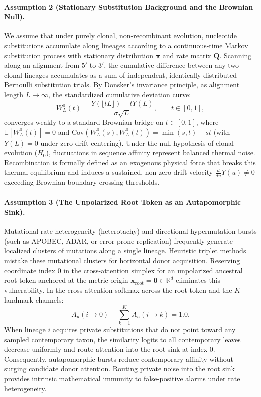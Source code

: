 \paragraph{Assumption 2 (Stationary Substitution Background and the Brownian Null).}
We assume that under purely clonal, non-recombinant evolution, nucleotide substitutions accumulate along lineages according to a continuous-time Markov substitution process with stationary distribution $\bm{\pi}$ and rate matrix $\mathbf{Q}$.
Scanning along an alignment from $5'$ to $3'$, the cumulative difference between any two clonal lineages accumulates as a sum of independent, identically distributed Bernoulli substitution trials.
By Donsker's invariance principle, as alignment length $L \to \infty$, the standardized cumulative deviation curve:
\begin{equation}
W_L^0(t) = \frac{Y(\lfloor tL \rfloor) - t Y(L)}{\sigma \sqrt{L}}, \qquad t \in [0, 1],
\end{equation}
converges weakly to a standard Brownian bridge on $t \in [0, 1]$, where $\mathbb{E}[W_L^0(t)] = 0$ and $\mathrm{Cov}(W_L^0(s), W_L^0(t)) = \min(s, t) - st$ (with $Y(L) = 0$ under zero-drift centering).
Under the null hypothesis of clonal evolution ($H_0$), fluctuations in sequence affinity represent balanced thermal noise.
Recombination is formally defined as an exogenous physical force that breaks this thermal equilibrium and induces a sustained, non-zero drift velocity $\frac{d}{du} Y(u) \ne 0$ exceeding Brownian boundary-crossing thresholds.

\paragraph{Assumption 3 (The Unpolarized Root Token as an Autapomorphic Sink).}
Mutational rate heterogeneity (heterotachy) and directional hypermutation bursts (such as APOBEC, ADAR, or error-prone replication) frequently generate localized clusters of mutations along a single lineage.
Heuristic triplet methods mistake these mutational clusters for horizontal donor acquisition.
Reserving coordinate index $0$ in the cross-attention simplex for an unpolarized ancestral root token anchored at the metric origin $\mathbf{x}_{\mathrm{root}} = \mathbf{0} \in \mathbb{R}^d$ eliminates this vulnerability.
In the cross-attention softmax across the root token and the $K$ landmark channels:
\begin{equation}
A_u(i \to 0) + \sum_{k=1}^K A_u(i \to k) = 1.0.
\end{equation}
When lineage $i$ acquires private substitutions that do not point toward any sampled contemporary taxon, the similarity logits to all contemporary leaves decrease uniformly and route attention into the root sink at index $0$.
Consequently, autapomorphic bursts reduce contemporary affinity without surging candidate donor attention.
Routing private noise into the root sink provides intrinsic mathematical immunity to false-positive alarms under rate heterogeneity.


